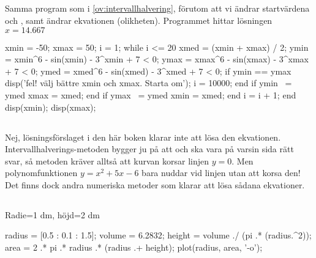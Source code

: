 \subsection*{}
Samma program som i \autoref{ov:intervallhalvering}, förutom att vi ändrar startvärdena  och , samt ändrar ekvationen (olikheten). Programmet hittar lösningen $x = 14.667$
\vspace{10pt}
\begin{matlab}
xmin = -50;
xmax = 50;
i = 1;
while i <= 20
	xmed = (xmin + xmax) / 2;
	ymin = xmin^6 - sin(xmin) - 3^xmin + 7 < 0;
	ymax = xmax^6 - sin(xmax) - 3^xmax + 7 < 0;
	ymed = xmed^6 - sin(xmed) - 3^xmed + 7 < 0;
	if ymin == ymax
		disp('fel! välj bättre xmin och xmax. Starta om');
	    i = 10000; %
	end
	if ymin ~= ymed
		xmax = xmed;
	end
	if ymax ~= ymed
		xmin = xmed;
	end
	i = i + 1;
end
disp(xmin);
disp(xmax);
\end{matlab}

\subsection*{}
Nej, lösningsförslaget i den här boken klarar inte att lösa den ekvationen. Intervallhalverings-metoden bygger ju på att  och  ska vara på varsin sida rätt svar, så metoden kräver alltså att kurvan korsar linjen $y=0$. Men polynomfunktionen $y = x^2 + 5x - 6$ bara nuddar vid linjen utan att korsa den! Det finns dock andra numeriska metoder som klarar att lösa sådana ekvationer.



\subsection*{}
Radie=1 dm, höjd=2 dm
\vspace{10pt}
\begin{matlab}
radius = [0.5 : 0.1 : 1.5];
volume = 6.2832;
height = volume ./ (pi .* (radius.^2));
area = 2 .* pi .* radius .* (radius .+ height);
plot(radius, area, '-o');
\end{matlab}




